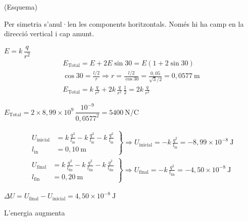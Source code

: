 \begin{solapartat}
 (Esquema)

 Per simetria s'anul·len les components horitzontals. Només hi ha camp en la direcció vertical i cap amunt.

 $E = k\,\dfrac{q}{r^2}$
\begin{gather*}
E_\mathrm{Total} = E + 2E\sin 30 = E(1 + 2\sin 30)\\
\cos 30 = \frac{l/2}{r} \Rightarrow r = \frac{l/2}{\cos 30} = \frac{0,05}{\sqrt{3}/2} = 0,0577\ \mathrm{m}\\
E_\mathrm{Total} = k\,\frac{q}{r^2} + 2k\,\frac{q}{r^2}\,\frac{1}{2} = 2k\,\frac{q}{r^2}
\end{gather*}

 $E_\mathrm{Total} = 2\times 8,99\times 10^{9}\,\dfrac{10^{-9}}{0,0577^2} = 5400\ \mathrm{N/C}$
\end{solapartat}

\begin{solapartat}
\begin{gather*}
\left.\begin{aligned}
U_\mathrm{inicial} &= k\,\frac{q^2}{l_\mathrm{in}} - k\,\frac{q^2}{l_\mathrm{in}} - k\,\frac{q^2}{l_\mathrm{in}}\\
l_\mathrm{in} &= 0,10\ \mathrm{m}
\end{aligned}\right\}\Rightarrow U_\mathrm{inicial} = -k\,\frac{q^2}{l_\mathrm{in}} = -8,99\times 10^{-8}\ \mathrm{J}\\
\left.\begin{aligned}
U_\mathrm{final} &= k\,\frac{q^2}{l_\mathrm{fin}} - k\,\frac{q^2}{l_\mathrm{fin}} - k\,\frac{q^2}{l_\mathrm{fin}}\\
l_\mathrm{fin} &= 0,20\ \mathrm{m}
\end{aligned}\right\}\Rightarrow U_\mathrm{final} = -k\,\frac{q^2}{l_\mathrm{fin}} = -4,50\times 10^{-8}\ \mathrm{J}
\end{gather*}

 $\Delta U = U_\mathrm{final} - U_\mathrm{inicial} = 4,50\times 10^{-8}\ \mathrm{J}$

L'energia augmenta
\end{solapartat}
